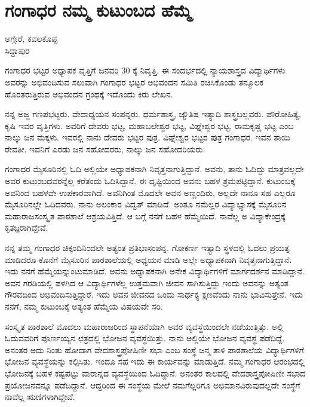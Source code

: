 {\fontsize{14}{16}\selectfont
\chapter{ಗಂಗಾಧರ ನಮ್ಮ ಕುಟುಂಬದ ಹೆಮ್ಮೆ}

\begin{center}
\smallskip

ಅಗ್ಗೇರೆ, ಕವಲಕೊಪ್ಪ \\ 
ಸಿದ್ದಾಪುರ
\addrule
\end{center}
ಗಂಗಾಧರ ಭಟ್ಟರ ಅಧ್ಯಾಪಕ ವೃತ್ತಿಗೆ ಜನವರಿ 30 ಕ್ಕೆ ನಿವೃತ್ತಿ. ಈ ಸಂದರ್ಭದಲ್ಲಿ ನ್ಯಾಯಶಾಸ್ತ್ರದ ವಿದ್ಯಾರ್ಥಿಗಳು ಅವರನ್ನು ಅಭಿವಂದಿಸುವ ಸಲುವಾಗಿ ಗಂಗಾಧರ ಭಟ್ಟರ ಅಭಿವಂದನ ಸಮಿತಿ ರಚಿಸಿಕೊಂಡು ತನ್ಮೂಲಕ ಹೊರತರುತ್ತಿರುವ ಅಭಿವಂದನ ಗ್ರಂಥಕ್ಕೆ ಇದೊಂದು ಕಿರು ಲೇಖನ.

ನನ್ನ ಅಜ್ಜ ಗಣಪಭಟ್ಟರು. ವೇದಾಧ್ಯಯನ ಸಂಪನ್ನರು. ಧರ್ಮಶಾಸ್ತ್ರ, ಜ್ಯೌತಿಷ ಇತ್ಯಾದಿ ಶಾಸ್ತ್ರಬಲ್ಲವರು. ಪೌರೋಹಿತ್ಯ, ಕೃಷಿ ಇವರ ವೃತ್ತಿಗಳು. ಅವರಿಗೆ ದೇವರು ಭಟ್ಟ, ಮಹಾಬಲೇಶ್ವರ ಭಟ್ಟ, ವಿಘ್ನೇಶ್ವರ ಭಟ್ಟ, ರಾಮಕೃಷ್ಣ ಭಟ್ಟ ಎಂಬ ನಾಲ್ಕು ಜನ ಮಕ್ಕಳು. ಇವರಲ್ಲಿ ನಾನು ದೇವರು ಭಟ್ಟರ ಪುತ್ರ. ವಿಘ್ನೇಶ್ವರ ಭಟ್ಟರ ಪುತ್ರ ಗಂಗಾಧರ. ಇವನ ತಾಯಿ ರೇವತೀ. ಇವನಿಗೆ ಎರಡು ಜನ ಸಹೋದರರು, ನಾಲ್ಕು ಜನ ಸಹೋದರಿಯರು.

ಗಂಗಾಧರ ಮೈಸೂರಿನಲ್ಲಿ ಓದಿ ಅಲ್ಲಿಯೇ ಅಧ್ಯಾಪಕನಾಗಿ ನಿವೃತ್ತನಾಗುತ್ತಿದ್ದಾನೆ. ಅವನು, ತಾನು ಓದಿದ್ದು ಮಾತ್ರವಲ್ಲದೇ ಅವರ ಕುಟುಂಬದವರನ್ನೆಲ್ಲ ಕರೆತಂದು ಓದಿಸಿದ್ದಾನೆ. ಈ ದೃಷ್ಟಿಯಿಂದ ಅವನು ಬಹಳ ಶ್ರಮಪಟ್ಟಿದ್ದಾನೆ. ಕುಟುಂಬಕ್ಕೆ ಅವನಿಂದ ಬಹಳವೇ ಉಪಕಾರವಾಗಿದೆ. ಅವನಿಗಿಂತ ಮೊದಲೇ ಅವನ ಅಣ್ಣಂದಿರು, ಅಲ್ಲದೇ ನಾನೂ ಸಹ ಎಲ್ಲರೂ ಮೈಸೂರಿನಲ್ಲೇ ಓದಿದವರು. ನಾನು ಅಲಂಕಾರ ವಿದ್ವತ್ ಮಾಡಿದೆ. ಅಂತೂ ನಮೆಲ್ಲರ ವಿದ್ಯಾಭ್ಯಾಸಕ್ಕೆ ಮೈಸೂರಿನ ಮಹಾರಾಜಸಂಸ್ಕೃತ ಪಾಠಶಾಲೆ ಆಶ್ರಯ\-ವಿತ್ತಿದೆ. ಆ ಬಗ್ಗೆ ನನಗೆ ಬಹಳ ಹೆಮ್ಮೆಯಿದೆ. ನಾವೆಲ್ಲ ಅ ವಿದ್ಯಾಕೇಂದ್ರಕ್ಕೆ ಕೃತಜ್ಞರಾಗಿದ್ದೇವೆ. 

ನನ್ನ ತಮ್ಮ ಗಂಗಾಧರ ಚಿಕ್ಕಂದಿನಿಂದಲೇ ಅತ್ಯಂತ ಪ್ರತಿಭಾಸಂಪನ್ನ. ಗೋಕರ್ಣ ಇತ್ಯಾದಿ ಸ್ಥಳದಲ್ಲಿ ಓದಲು ಪ್ರಯತ್ನ ಮಾಡಿದರೂ ಕೊನೆಗೆ ಮೈಸೂರಿನ ಪಾಠಶಾಲೆಯಲ್ಲಿ ಅಧ್ಯಯನ ಮಾಡಿ ಅಲ್ಲೇ ಅಧ್ಯಾಪಕನಾಗಿ ನಿವೃತ್ತನಾಗುತ್ತಿದ್ದಾನೆ. ಇದು ನನಗೆ ಹೆಮ್ಮೆಯನ್ನುಂಟುಮಾಡಿದೆ. ಅವನು ಅಧ್ಯಾಪಕನಾಗಿ ಅನೇಕ ವಿದ್ಯಾರ್ಥಿಗಳಿಗೆ ಮಾರ್ಗದರ್ಶನ ಮಾಡಿದ್ದಾನೆ. ಅವನ ಗರಡಿಯಲ್ಲಿ ಪಳಗಿದ ಆ ವಿದ್ಯಾರ್ಥಿಗಳೆಲ್ಲ ಉತ್ತಮವಾಗಿ ಜೀವನ ಸಾಗಿಸುತ್ತಿದ್ದು ಇಂದು ಅವನನ್ನು ಅತ್ಯಂತ ಗೌರವದಿಂದ ಅಭಿವಂದಿಸುತ್ತಿದ್ದಾರೆ. ಇದು ಅವನ ಜೀವನದ ಒಂದು ಸಾರ್ಥಕ್ಯ ಕ್ಷಣವೆಂದು ನಾನು ಭಾವಿಸುತ್ತೇನೆ. ಇದು ನನಗೆ, ನಮ್ಮ ಕುಟುಂಬಕ್ಕೆ ಅತ್ಯಂತ ಹೆಮ್ಮೆಯ ವಿಷಯವೇ ಸರಿ.

ಸಂಸ್ಕೃತ ಪಾಠಶಾಲೆ ಮೊದಲು ಮಹಾರಾಜರಿಂದ ಸ್ಥಾಪನೆಯಾಗಿ ಅವರ ವ್ಯವಸ್ಥೆಯಿಂದಲೇ ನಡೆಯುತ್ತಿತ್ತು. ಅಲ್ಲಿ ಓದುವವರಿಗೆ ಪೂರ್ಣಯ್ಯನ ಛತ್ರದಲ್ಲಿ ಭೋಜನ ವ್ಯವಸ್ಥೆಯಿತ್ತು. ನಾನು ಅಲ್ಲಿಯೇ ಭೋಜನ ವ್ಯವಸ್ಥೆ ಪಡೆದಿದ್ದೆ. ಅನಂತರ ಅದು ನಿಂತು ಹೋದಾಗ ವೇದಶಾಸ್ತ್ರಪೋಷಿಣೀ ಸಭಾ ಎಂಬ ಸಂಸ್ಥೆ ಜನ್ಮ ತಾಳಿ ಪಾಠಶಾಲೆಯ ವಿದ್ಯಾರ್ಥಿ\-ಗಳಿಗೆ ಭೋಜನ ವ್ಯವಸ್ಥೆಯನ್ನು ಕಲ್ಪಿಸಿತು. ಇಂದೂ ಸಹ ಇದು ಈ ಕಾರ್ಯವನ್ನು ಮಾಡುತ್ತಿದೆ. ನಮ್ಮ ಗಂಗಾಧರ ಆರಂಭದಲ್ಲಿ ಭೋಜನಕ್ಕೆ ಬಹಳ ಕಷ್ಟಪಟ್ಟು ವಾರಾನ್ನದ ವ್ಯವಸ್ಥೆಯಿಂದ ಓದಿದ್ದಾನೆ. ಅನಂತರ ಕಾಲದಲ್ಲಿ ವೇದಶಾಸ್ತ್ರಪೋಷಿಣೀ ಸಭಾದ ಪ್ರಯೋಜನವನ್ನೂ ಪಡೆದಿದ್ದಾನೆ. ಆದ್ದರಿಂದ ಈ ಸಂಸ್ಥೆಯ ಮೇಲೆ ನಮಗೆಲ್ಲರಿಗೂ ಅಭಿಮಾನವಿರುವುದಲ್ಲದೇ ಸಂಸ್ಥೆಗೆ ನಾವೆಲ್ಲ ಋಣಿಗಳಾಗಿದ್ದೇವೆ. 

}
